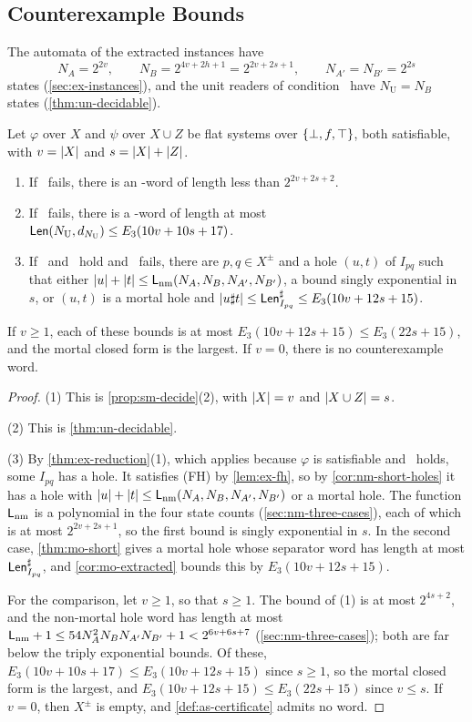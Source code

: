 \subsection{Counterexample Bounds}\label{sec:as-bounds}

The automata of the extracted instances have
\[
 N_A=2^{2v},\qquad N_B=2^{4v+2h+1}=2^{2v+2s+1},\qquad N_{A'}=N_{B'}=2^{2s}
\]
states (\cref{sec:ex-instances}), and the unit readers of condition \CondU\
have $N_{\mathrm U}=N_B$ states (\cref{thm:un-decidable}).

\begin{proposition}[Counterexample bounds]\label{prop:as-bounds}
Let $\varphi$ over $X$ and $\psi$ over $X\cup Z$ be flat systems over $\{\bot,f,\top\}$,
both satisfiable, with $v=\lvert X\rvert$ and $s=\lvert X\rvert+\lvert Z\rvert$.
\begin{enumerate}[leftmargin=*]
\item If \CondI\ fails, there is an \CondI-word of length less than
  $2^{2v+2s+2}$.
\item If \CondU\ fails, there is a \CondU-word of length at most
  $\mathsf{Len}(N_{\mathrm U},d_{N_{\mathrm U}})\le E_3(10v+10s+17)$.
\item If \CondI\ and \CondU\ hold and \CondII\ fails, there are
  $p,q\in X^\pm$ and a hole $(u,t)$ of $I_{pq}$ such that either
  $\lvert u\rvert+\lvert t\rvert\le\mathsf L_{\mathrm{nm}}(N_A,N_B,N_{A'},N_{B'})$, a bound singly exponential in
  $s$, or $(u,t)$ is a mortal hole and
  $\lvert u\sharp t\rvert\le\mathsf{Len}^{\sharp}_{I_{pq}}\le E_3(10v+12s+15)$.
\end{enumerate}
If $v\ge1$, each of these bounds is at most $E_3(10v+12s+15)\le E_3(22s+15)$,
and the mortal closed form is the largest. If $v=0$, there is no counterexample
word.
\end{proposition}

\begin{proof}
(1) This is \cref{prop:sm-decide}(2), with $\lvert X\rvert=v$ and $\lvert X\cup Z\rvert=s$.

(2) This is \cref{thm:un-decidable}.

(3) By \cref{thm:ex-reduction}(1), which applies because $\varphi$ is
satisfiable and \CondU\ holds, some $I_{pq}$ has a hole. It satisfies (FH) by
\cref{lem:ex-fh}, so by \cref{cor:nm-short-holes} it has a hole with
$\lvert u\rvert+\lvert t\rvert\le\mathsf L_{\mathrm{nm}}(N_A,N_B,N_{A'},N_{B'})$ or a mortal hole. The function
$\mathsf L_{\mathrm{nm}}$ is a polynomial in the four state counts (\cref{sec:nm-three-cases}),
each of which is at most $2^{2v+2s+1}$, so the first bound is singly
exponential in $s$. In the second case, \cref{thm:mo-short} gives a mortal hole
whose separator word has length at most $\mathsf{Len}^{\sharp}_{I_{pq}}$, and
\cref{cor:mo-extracted} bounds this by $E_3(10v+12s+15)$.

For the comparison, let $v\ge1$, so that $s\ge1$. The bound of (1) is at most
$2^{4s+2}$, and the non-mortal hole word has length at most
$\mathsf L_{\mathrm{nm}}+1\le54N_A^2N_BN_{A'}N_{B'}+1<2^{6v+6s+7}$ (\cref{sec:nm-three-cases});
both are far below the triply exponential bounds. Of these,
$E_3(10v+10s+17)\le E_3(10v+12s+15)$ since $s\ge1$, so the mortal closed form is the
largest, and $E_3(10v+12s+15)\le E_3(22s+15)$ since $v\le s$. If $v=0$, then
$X^\pm$ is empty, and \cref{def:as-certificate} admits no word.
\end{proof}

